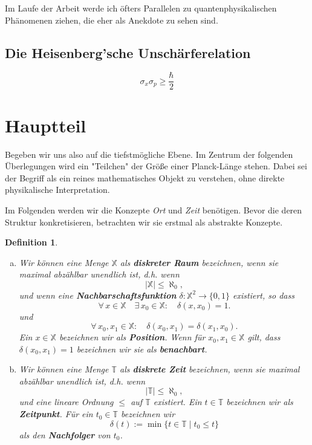 \documentclass[a4paper,12pt,ngerman]{scrartcl}
\theoremstyle{plain}
\newtheorem{definition}{Definition}
\theoremstyle{plain}
\newcommand{\T}{\mathbb{T}}
\newcommand{\X}{\mathbb{X}}
\begin{document}
Im Laufe der Arbeit werde ich öfters Parallelen zu quantenphysikalischen Phänomenen ziehen, die eher als Anekdote zu sehen sind. %

\subsection{Die Heisenberg'sche Unschärferelation}


\[\sigma_x \sigma_p \geq \frac{\hbar}{2}\]

\section{Hauptteil}

Begeben wir uns also auf die tiefstmögliche Ebene. Im Zentrum der folgenden Überlegungen wird ein "Teilchen" der Größe einer Planck-Länge stehen. Dabei sei der Begriff als ein reines mathematisches Objekt zu verstehen, ohne direkte physikalische Interpretation.

Im Folgenden werden wir die Konzepte \textit{Ort} und \textit{Zeit} benötigen. Bevor die deren Struktur konkretisieren, betrachten wir sie erstmal als abstrakte Konzepte.

\begin{definition}\label{def_ortundzeit}
\begin{enumerate}[(a)]
\item Wir können eine Menge $\X$ als \textbf{diskreter Raum} bezeichnen, wenn sie maximal abzählbar unendlich ist, d.h. wenn
\[ |\X| \leq \aleph_0,\]
und wenn eine \textbf{Nachbarschaftsfunktion} $\delta: \X^2\rightarrow\{0,1\}$ existiert, so dass
\[\forall\, x\in\X\quad\exists\, x_0\in\X: \quad\delta(x,x_0)=1.\]
und
\[\forall\, x_0,x_1\in\X: \quad\delta(x_0,x_1)=\delta(x_1,x_0).\]
Ein $x\in\X$ bezeichnen wir als \textbf{Position}. Wenn für $x_0,x_1\in\X$ gilt, dass $\delta(x_0,x_1)=1$ bezeichnen wir sie als \textbf{benachbart}. 
\item Wir können eine Menge $\T$ als \textbf{diskrete Zeit} bezeichnen, wenn sie maximal abzählbar unendlich ist, d.h. wenn
\[ |\T| \leq \aleph_0,\]
und eine lineare Ordnung $\leq$ auf $\T$ existiert. Ein $t\in\T$ bezeichnen wir als \textbf{Zeitpunkt}. Für ein $t_0\in\T$ bezeichnen wir
\[\delta(t):=\operatorname{min}\{t\in\T \;|\; t_0\leq t\}\]
als den \textbf{Nachfolger} von $t_0$.
\end{enumerate}
\end{definition} %
\end{document}
